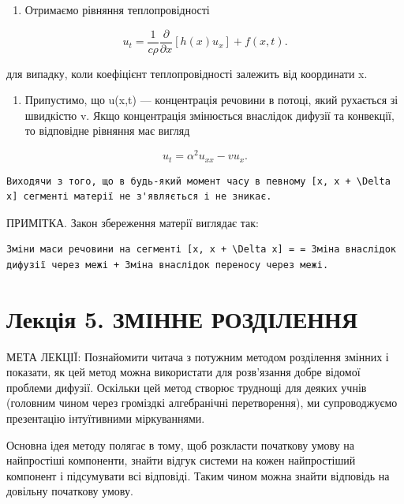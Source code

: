 \documentclass[
  ukrainian,
]{article}
\providecommand{\tightlist}{%
  \setlength{\itemsep}{0pt}\setlength{\parskip}{0pt}}
\begin{document}
\begin{enumerate}
\def\labelenumi{\arabic{enumi}.}
\setcounter{enumi}{2}
\tightlist
\item
  Отримаємо рівняння теплопровідності
\end{enumerate}

\[
u_t = \frac{1}{c\rho}\frac{\partial}{\partial x}\left[h(x)u_x\right] + f(x,t).
\]

для випадку, коли коефіцієнт теплопровідності залежить від координати x.

\begin{enumerate}
\def\labelenumi{\arabic{enumi}.}
\setcounter{enumi}{3}
\tightlist
\item
  Припустимо, що u(x,t) --- концентрація речовини в потоці, який
  рухається зі швидкістю v. Якщо концентрація змінюється внаслідок
  дифузії та конвекції, то відповідне рівняння має вигляд
\end{enumerate}

\[
u_t = \alpha^2 u_{xx} - v u_x.
\]

\begin{verbatim}
Виходячи з того, що в будь-який момент часу в певному [x, x + \Delta x] сегменті матерії не з'являється і не зникає.
\end{verbatim}

ПРИМІТКА. Закон збереження матерії виглядає так:

\begin{verbatim}
Зміни маси речовини на сегменті [x, x + \Delta x] = = Зміна внаслідок дифузії через межі + Зміна внаслідок переносу через межі.
\end{verbatim}

\section{Лекція 5. ЗМІННЕ
РОЗДІЛЕННЯ}\label{ux43bux435ux43aux446ux456ux44f-5.-ux437ux43cux456ux43dux43dux435-ux440ux43eux437ux434ux456ux43bux435ux43dux43dux44f}

МЕТА ЛЕКЦІЇ: Познайомити читача з потужним методом розділення змінних і
показати, як цей метод можна використати для розв'язання добре відомої
проблеми дифузії. Оскільки цей метод створює труднощі для деяких учнів
(головним чином через громіздкі алгебранічні перетворення), ми
супроводжуємо презентацію інтуїтивними міркуваннями.

Основна ідея методу полягає в тому, щоб розкласти початкову умову на
найпростіші компоненти, знайти відгук системи на кожен найпростіший
компонент і підсумувати всі відповіді. Таким чином можна знайти
відповідь на довільну початкову умову.
\end{document}
